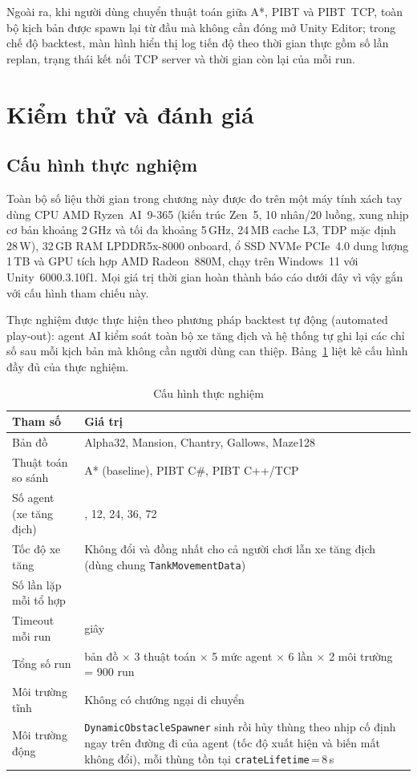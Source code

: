 \documentclass[../DoAn.tex]{subfiles}
\begin{document}
Ngoài ra, khi người dùng chuyển thuật toán giữa A*, PIBT và PIBT~TCP, toàn bộ kịch bản
được spawn lại từ đầu mà không cần đóng mở Unity Editor; trong chế độ backtest, màn hình
hiển thị log tiến độ theo thời gian thực gồm số lần replan, trạng thái kết nối TCP server
và thời gian còn lại của mỗi run.

\section{Kiểm thử và đánh giá}
\label{sec:experiment}

\subsection{Cấu hình thực nghiệm}

Toàn bộ số liệu thời gian trong chương này được đo trên một máy tính xách tay dùng CPU AMD
Ryzen~AI~9-365 (kiến trúc Zen~5, 10 nhân/20 luồng, xung nhịp cơ bản khoảng 2\,GHz và tối đa
khoảng 5\,GHz, 24\,MB cache L3, TDP mặc định 28\,W), 32\,GB RAM LPDDR5x-8000 onboard, ổ SSD
NVMe PCIe~4.0 dung lượng 1\,TB và GPU tích hợp AMD Radeon~880M, chạy trên Windows~11 với
Unity~6000.3.10f1. Mọi giá trị thời gian hoàn thành báo cáo dưới đây vì vậy gắn với cấu hình
tham chiếu này.

Thực nghiệm được thực hiện theo phương pháp backtest tự động (automated play-out): agent AI kiểm
soát toàn bộ xe tăng địch và hệ thống tự ghi lại các chỉ số sau mỗi kịch bản mà không cần người
dùng can thiệp. Bảng~\ref{tab:exp_config} liệt kê cấu hình đầy đủ của thực nghiệm.

\begin{table}[htbp]
\centering
\caption{Cấu hình thực nghiệm}
\label{tab:exp_config}
\begin{tabular}{|l|>{\raggedright\arraybackslash}p{8.4cm}|}
\hline
\textbf{Tham số} & \textbf{Giá trị} \\ \hline
Bản đồ & Alpha32, Mansion, Chantry, Gallows, Maze128 \\
\hline
Thuật toán so sánh & A* (baseline), PIBT C\#, PIBT C++/TCP \\
\hline
Số agent (xe tăng địch) & 6, 12, 24, 36, 72 \\
\hline
Tốc độ xe tăng & Không đổi và đồng nhất cho cả người chơi lẫn xe tăng địch (dùng chung \texttt{TankMovementData}) \\
\hline
Số lần lặp mỗi tổ hợp & 6 \\
\hline
Timeout mỗi run & 180 giây \\
\hline
Tổng số run & 5 bản đồ \(\times\) 3 thuật toán \(\times\) 5 mức agent \(\times\) 6 lần \(\times\) 2 môi trường = 900 run \\
\hline
Môi trường tĩnh & Không có chướng ngại di chuyển \\
\hline
Môi trường động & \texttt{DynamicObstacleSpawner} sinh rồi hủy thùng theo nhịp cố định ngay trên đường đi của agent (tốc độ xuất hiện và biến mất không đổi), mỗi thùng tồn tại \texttt{crateLifetime}\,=\,8\,s \\
\hline
\end{tabular}
\end{table}
\end{document}
